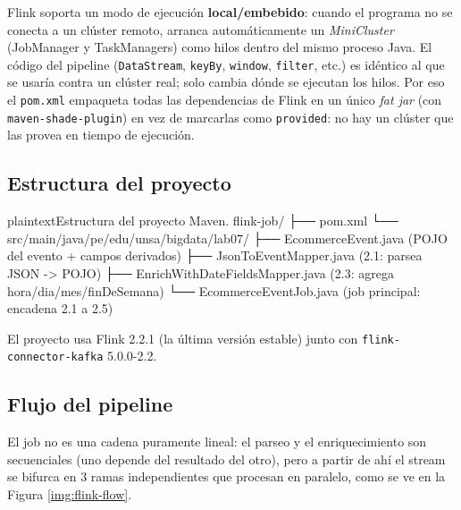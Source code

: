 		Flink soporta un modo de ejecución \textbf{local/embebido}: cuando el programa no se conecta a un clúster remoto, arranca automáticamente un \textit{MiniCluster} (JobManager y TaskManagers) como hilos dentro del mismo proceso Java. El código del pipeline (\texttt{DataStream}, \texttt{keyBy}, \texttt{window}, \texttt{filter}, etc.) es idéntico al que se usaría contra un clúster real; solo cambia dónde se ejecutan los hilos. Por eso el \texttt{pom.xml} empaqueta todas las dependencias de Flink en un único \textit{fat jar} (con \texttt{maven-shade-plugin}) en vez de marcarlas como \texttt{provided}: no hay un clúster que las provea en tiempo de ejecución.

	\subsection{Estructura del proyecto}

		\begin{sourcecode}[\label{codigo-flink-estructura}]{plaintext}{Estructura del proyecto Maven.}
flink-job/
├── pom.xml
└── src/main/java/pe/edu/unsa/bigdata/lab07/
    ├── EcommerceEvent.java              (POJO del evento + campos derivados)
    ├── JsonToEventMapper.java           (2.1: parsea JSON -> POJO)
    ├── EnrichWithDateFieldsMapper.java  (2.3: agrega hora/dia/mes/finDeSemana)
    └── EcommerceEventJob.java           (job principal: encadena 2.1 a 2.5)
		\end{sourcecode}

		El proyecto usa Flink 2.2.1 (la última versión estable) junto con \texttt{flink-connector-kafka} 5.0.0-2.2.

	\subsection{Flujo del pipeline}

		El job no es una cadena puramente lineal: el parseo y el enriquecimiento son secuenciales (uno depende del resultado del otro), pero a partir de ahí el stream se bifurca en 3 ramas independientes que procesan en paralelo, como se ve en la Figura \ref{img:flink-flow}.


